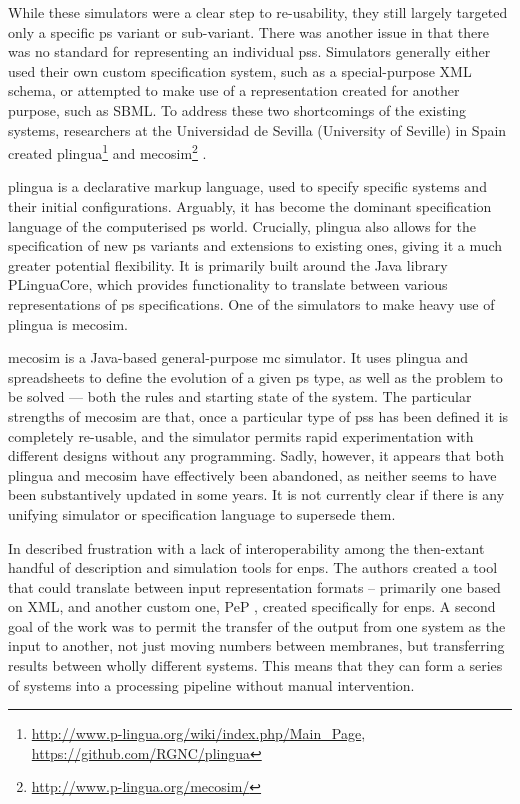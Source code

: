While these simulators were a clear step to re-usability, they still largely targeted only a specific \gls{ps} variant or sub-variant.  There was another issue in that there was no standard for representing an individual \glspl{ps}.  Simulators generally either used their own custom specification system, such as a special-purpose XML schema, or attempted to make use of a representation created for another purpose, such as SBML.  To address these two shortcomings of the existing systems, researchers at the Universidad de Sevilla (University of Seville) in Spain created \gls{plingua}\footnote{\url{http://www.p-lingua.org/wiki/index.php/Main_Page}, \url{https://github.com/RGNC/plingua}} \cite{Diaz-Pernil2008a,Garcia-Quismondo2010} and \gls{mecosim}\footnote{\url{http://www.p-lingua.org/mecosim/}} \cite{Perez-Hurtado2010}.

\Gls{plingua} is a declarative markup language, used to specify specific systems and their initial configurations.  Arguably, it has become the dominant specification language of the computerised \gls{ps} world.  Crucially, \gls{plingua} also allows for the specification of new \gls{ps} variants and extensions to existing ones, giving it a much greater potential flexibility.  It is primarily built around the Java library PLinguaCore, which provides functionality to translate between various representations of \gls{ps} specifications.  One of the simulators to make heavy use of \gls{plingua} is \gls{mecosim}.

\Gls{mecosim} is a Java-based general-purpose \gls{mc} simulator.  It uses \gls{plingua} and spreadsheets to define the evolution of a given \gls{ps} type, as well as the problem to be solved --- both the rules and starting state of the system.  The particular strengths of \gls{mecosim} are that, once a particular type of \glspl{ps} has been defined it is completely re-usable, and the simulator permits rapid experimentation with different designs without any programming.  Sadly, however, it appears that both \gls{plingua} and \gls{mecosim} have effectively been abandoned, as neither seems to have been substantively updated in some years.  It is not currently clear if there is any unifying simulator or specification language to supersede them.

In \cite{Raghavan2020a} \citeauthor{Raghavan2020a} described frustration with a lack of interoperability among the then-extant handful of description and simulation tools for \gls{enps}.  The authors created a tool that could translate between input representation formats -- primarily one based on XML, and another custom one, PeP \cite{Florea2017,Florea2018}, created specifically for \gls{enps}.  A second goal of the work was to permit the transfer of the output from one system as the input to another, \ie{} not just moving numbers between membranes, but transferring results between wholly different systems.  This means that they can form a series of systems into a processing pipeline without manual intervention.

